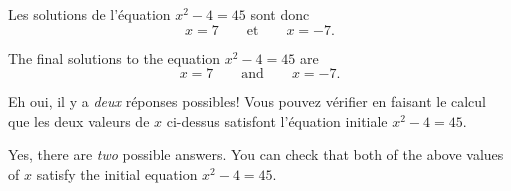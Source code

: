\begin{paracol}{2}

	\begin{leftcolumn*}

		\begin{otherlanguage}{french}
	Les solutions de l'équation $x^2-4=45$ sont donc
	\[
	 	x  = 7 \qquad \textrm{et} \qquad   x=  - 7.
	\]
		\end{otherlanguage}

	\end{leftcolumn*}



	\begin{rightcolumn}

	The final solutions to the equation $x^2-4=45$ are
	\[
	 	x  = 7 \qquad \textrm{and} \qquad   x=  - 7.
	\]

	\end{rightcolumn}

\end{paracol}


\begin{paracol}{2}

	\begin{leftcolumn*}

		\begin{otherlanguage}{french}
	Eh oui, il y a \emph{deux} réponses possibles!
	Vous pouvez vérifier en faisant le calcul que les deux valeurs de $x$ ci-dessus satisfont l'équation initiale $x^2-4=45$.

	\bigskip


		\end{otherlanguage}

	\end{leftcolumn*}



	\begin{rightcolumn}

	Yes, there are \emph{two} possible answers. 
	You can check that both of the above values of $x$ satisfy the initial equation $x^2-4=45$.

	\bigskip



	\end{rightcolumn}

\end{paracol}

